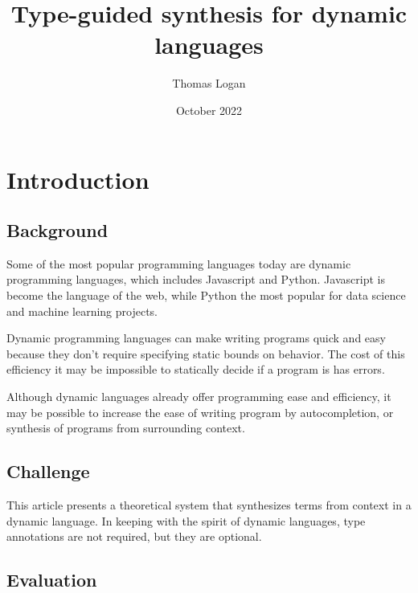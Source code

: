 \documentclass[]{acmart}
\title{Type-guided synthesis for dynamic languages}
\author{Thomas Logan}
\date{October 2022}
\begin{document}
\maketitle

\section{Introduction}
\subsection*{Background}
Some of the most popular programming languages today are 
dynamic programming languages, which includes Javascript and Python. 
Javascript is become the language of the web, while Python the most popular
for data science and machine learning projects. 

Dynamic programming languages can make writing programs quick and easy 
because they don't require specifying static bounds on behavior.
The cost of this efficiency it may be impossible to statically decide 
if a program is has errors.  

Although dynamic languages already offer programming ease and efficiency, it
may be possible to increase the ease of writing program by autocompletion,
or synthesis of programs from surrounding context. 

\subsection*{Challenge}
This article presents a theoretical system that synthesizes terms from context 
in a dynamic language. In keeping with the spirit of dynamic languages, 
type annotations are not required, but they are optional. 

\subsection*{Evaluation}







\end{document}
